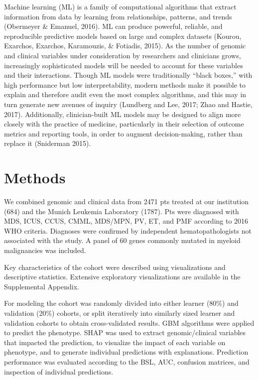 \documentclass[
]{article}
\begin{document}
Machine learning (ML) is a family of computational algorithms that
extract information from data by learning from relationships, patterns,
and trends (Obermeyer \& Emanuel, 2016). ML can produce powerful,
reliable, and reproducible predictive models based on large and complex
datasets (Kourou, Exarchos, Exarchos, Karamouzis, \& Fotiadis, 2015). As
the number of genomic and clinical variables under consideration by
researchers and clinicians grows, increasingly sophisticated models will
be needed to account for these variables and their interactions. Though
ML models were traditionally ``black boxes,'' with high performance but
low interpretability, modern methods make it possible to explain and
therefore audit even the most complex algorithms, and this may in turn
generate new avenues of inquiry (Lundberg and Lee, 2017; Zhao and
Hastie, 2017). Additionally, clinician-built ML models may be designed
to align more closely with the practice of medicine, particularly in
their selection of outcome metrics and reporting tools, in order to
augment decision-making, rather than replace it (Sniderman 2015).

\hypertarget{methods-1}{%
\section{Methods}\label{methods-1}}

We combined genomic and clinical data from 2471 pts treated at our
institution (684) and the Munich Leukemia Laboratory (1787). Pts were
diagnosed with MDS, ICUS, CCUS, CMML, MDS/MPN, PV, ET, and PMF according
to 2016 WHO criteria. Diagnoses were confirmed by independent
hematopathologists not associated with the study. A panel of 60 genes
commonly mutated in myeloid malignancies was included.

Key characteristics of the cohort were described using visualizations
and descriptive statistics. Extensive exploratory visualizations are
available in the Supplemental Appendix.

For modeling the cohort was randomly divided into either learner (80\%)
and validation (20\%) cohorts, or split iteratively into similarly sized
learner and validation cohorts to obtain cross-validated results. GBM
algorithms were applied to predict the phenotype. SHAP was used to
extract genomic/clinical variables that impacted the prediction, to
visualize the impact of each variable on phenotype, and to generate
individual predictions with explanations. Prediction performance was
evaluated according to the BSL, AUC, confusion matrices, and inspection
of individual predictions.
\end{document}
